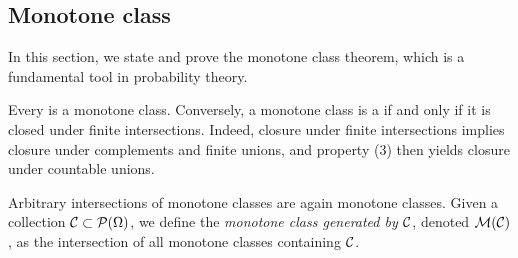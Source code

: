 \documentclass[../Main.tex]{subfiles}
\begin{document}
\subsection{Monotone class}
In this section, we state and prove the monotone class theorem, which is a
fundamental tool in probability theory.

Every \sfield is a monotone class. Conversely, a monotone class is a \sfield if and only if it is closed under finite intersections. Indeed, closure under finite intersections implies closure under complements and finite unions, and property (3) then yields closure under countable unions.

Arbitrary intersections of monotone classes are again monotone classes. Given a collection $\mathcal{C} \subset \mathcal{P}(\Omega)$, we define the \emph{monotone class generated by $\mathcal{C}$}, denoted $\mathcal{M}(\mathcal{C})$, as the intersection of all monotone classes containing $\mathcal{C}$.
\end{document}
